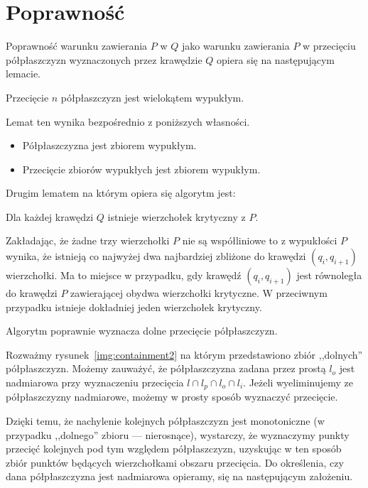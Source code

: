\section{Poprawność}
Poprawność warunku zawierania $P$ w $Q$ jako warunku zawierania $P$ w
przecięciu półpłaszczyzn wyznaczonych przez krawędzie $Q$ opiera się
na następującym lemacie.

\begin{lemat}
  Przecięcie $n$ półpłaszczyzn jest wielokątem wypukłym.
\end{lemat}

Lemat ten wynika bezpośrednio z poniższych własności.

\begin{itemize}
  \item Półpłaszczyzna jest zbiorem wypukłym.
  \item Przecięcie zbiorów wypukłych jest zbiorem wypukłym.
\end{itemize}

Drugim lematem na którym opiera się algorytm jest:

\begin{lemat}
  Dla każdej krawędzi $Q$ istnieje wierzchołek krytyczny z $P$.
\end{lemat}

Zakładając, że żadne trzy wierzchołki $P$ nie są współliniowe to z
wypukłości $P$ wynika, że istnieją co najwyżej dwa najbardziej
zbliżone do krawędzi $(q_i,q_{i+1})$ wierzchołki. Ma to miejsce w
przypadku, gdy krawędź $(q_i,q_{i+1})$ jest równoległa do krawędzi $P$
zawierającej obydwa wierzchołki krytyczne. W przeciwnym przypadku
istnieje dokładniej jeden wierzchołek krytyczny.

\begin{lemat}
  Algorytm poprawnie wyznacza dolne przecięcie półpłaszczyzn.
\end{lemat}

Rozważmy rysunek~\ref{img:containment2} na którym przedstawiono zbiór
,,dolnych'' półpłaszczyzn. Możemy zauważyć, że półpłaszczyzna zadana
przez prostą $l_o$ jest nadmiarowa przy wyznaczeniu przecięcia $l \cap
l_p \cap l_o \cap l_i$. Jeżeli wyeliminujemy ze półpłaszczyzny
nadmiarowe, możemy w prosty sposób wyznaczyć przecięcie.

Dzięki temu, że nachylenie kolejnych półpłaszczyzn jest monotoniczne
(w przypadku ,,dolnego'' zbioru --- nierosnące), wystarczy, że
wyznaczymy punkty przecięć kolejnych pod tym względem półpłaszczyzn,
uzyskując w ten sposób zbiór punktów będących wierzchołkami obszaru
przecięcia. Do określenia, czy dana półpłaszczyzna jest nadmiarowa
opieramy, się na następującym założeniu.


